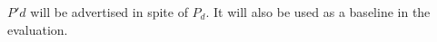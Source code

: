 $P'd$ will be advertised in spite of $P_d$. It will also be used as a baseline in the evaluation.






